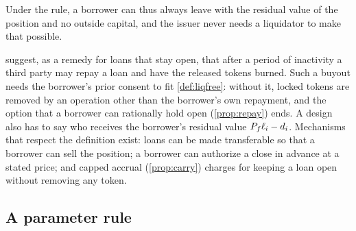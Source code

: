 Under the rule, a borrower can thus always leave with the residual value of the position and no outside capital, and the issuer never needs a liquidator to make that possible.

 suggest, as a remedy for loans that stay open, that after a period of inactivity a third party may repay a loan and have the released tokens burned. Such a buyout needs the borrower's prior consent to fit \cref{def:liqfree}: without it, locked tokens are removed by an operation other than the borrower's own repayment, and the option that a borrower can rationally hold open (\cref{prop:repay}) ends. A design also has to say who receives the borrower's residual value $P_f\ell_i-d_i$. Mechanisms that respect the definition exist: loans can be made transferable so that a borrower can sell the position; a borrower can authorize a close in advance at a stated price; and capped accrual (\cref{prop:carry}) charges for keeping a loan open without removing any token.

\subsection{A parameter rule}

